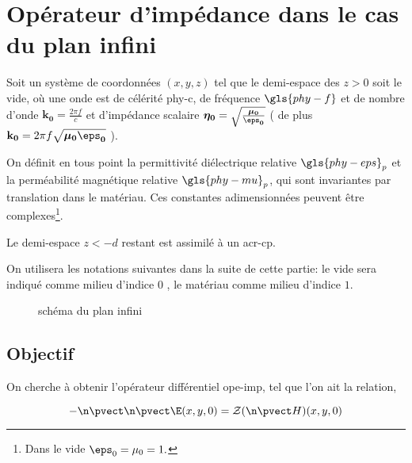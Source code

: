 \section{Opérateur d'impédance dans le cas du plan infini}\label{sec:coeffs_ref}

\newcommand{\x}{{x}}
\newcommand{\y}{{y}}
\newcommand{\z}{{z}}

\newcommand{\kO}{\mathbf{k_0}}
\newcommand{\etaO}{\boldsymbol{\eta_0}}
\newcommand{\muO}{\boldsymbol{\mu_0}}
\newcommand{\epsO}{\boldsymbol{\eps_0}}
\newcommand{\nuO}{\boldsymbol{\nu_0}}

Soit un système de coordonnées $(\x,\y,\z)$ tel que le demi-espace des $\z>0$ soit le vide, où une onde est de célérité \gls{phy-c}, de fréquence $\gls{phy-f}$ et de nombre d'onde $\kO=\frac{2\pi f}{c}$  et d'impédance scalaire $\etaO = \sqrt{\frac{\muO}{\epsO}}$ ( de plus $\kO=2\pi f\sqrt{\muO\epsO}$ ).

On définit en tous point la permittivité diélectrique relative $\gls{phy-eps}_p$ et la perméabilité magnétique relative $\gls{phy-mu}_p$, qui sont invariantes par translation dans le matériau. Ces constantes adimensionnées peuvent être complexes\footnote{Dans le vide $\eps_0=\mu_0=1.$}.

Le demi-espace $\z<-d$ restant est assimilé à un \gls{acr-cp}.

On utilisera les notations  suivantes dans la suite de cette partie: le vide sera indiqué comme milieu d'indice $0$ , le matériau comme milieu d'indice $1$.

\begin{figure}[h!]
\centering
 \begin{tikzpicture}
 
\end{tikzpicture}
  \caption{schéma du plan infini}
\end{figure}\label{fig:tikz:plan}

\subsection{Objectif}
On cherche à obtenir l'opérateur différentiel \gls{ope-imp}, tel que l'on ait la relation,

\begin{equation}
 \label{eq:coeff_ref:intro:ci}
 -\n \pvect \n \pvect \E(\x,\y,0) = \mathcal{Z}( \n \pvect H)(\x,\y,0)
\end{equation}

